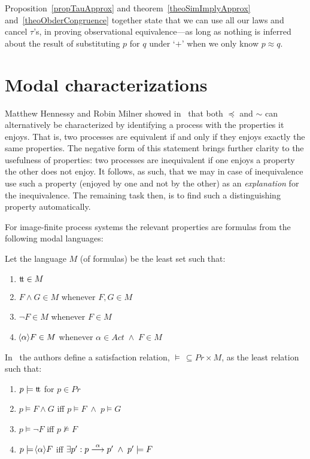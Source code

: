 \noindent
Proposition~\ref{propTauApprox} and theorem~\ref{theoSimImplyApprox} and~\ref{theoObderCongruence} together state that we can use all our laws and cancel $\tau$'s, in proving observational equivalence---as long as nothing is inferred about the result of substituting $p$ for $q$ under `$+$' when we only know $p\approx q$.

\section{Modal characterizations}
Matthew Hennessy and Robin Milner showed in~\cite{HennessyMilner} that both $\preceq$ and $\sim$ can alternatively be characterized by identifying a process with the properties it enjoys. That is, two processes are equivalent if and only if they enjoys exactly the same properties. The negative form of this statement brings further clarity to the usefulness of properties: two processes are inequivalent if one enjoys a property the other does not enjoy. It follows, as such, that we may in case of inequivalence use such a property (enjoyed by one and not by the other) as an {\em explanation\/} for the inequivalence. The remaining task then, is to find such a distinguishing property automatically.

For image-finite process systems the relevant properties are formulas from the following modal languages:

\noindent
Let the language $M$ (of formulas) be the least set such that:
\begin{enumerate}
\item $\hbox{t}\!\hbox{t}\in M$
\item $F\wedge G\in M$ whenever $F, G\in M$
\item $\neg F\in M$ whenever $F\in M$
\item $\!\left<\alpha\right>\!F\in M$ whenever $\alpha\in Act\;\wedge\; F\in M$
\end{enumerate}
In~\cite{HennessyMilner} the authors define a satisfaction relation, $\models\,\subseteq Pr\times M$, as the least relation such that:
\begin{enumerate}
\item $p\models \hbox{t}\!\hbox{t}$ for $p\in Pr$
\item $p\models F\wedge G$ iff $p\models F\;\wedge\; p\models G$
\item $p\models \neg F$ iff $p\not\models F$
\item $p\models\!\left<\alpha\right>\!F$ iff $\exists p': p\stackrel{\alpha}{\longrightarrow}p'\;\wedge\; p'\models F$
\end{enumerate}

